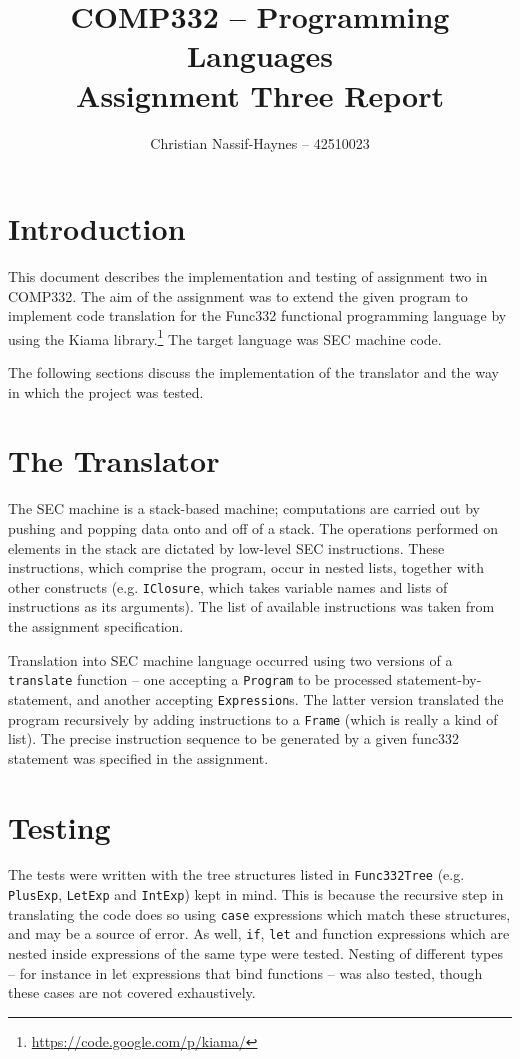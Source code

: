 \documentclass[a4paper]{article}
\begin{document}
	\begin{titlepage}
		\title{COMP332 -- Programming Languages \\[5pt]
		Assignment Three Report \vfill}
		\author{Christian Nassif-Haynes -- 42510023}
		\maketitle
	\end{titlepage}
	
	\section{Introduction}
	This document describes the implementation and testing of assignment two in COMP332. The aim of the assignment was to extend the given program to implement code translation for the Func332 functional programming language by using the Kiama library.\footnote{\url {https://code.google.com/p/kiama/}} The target language was SEC machine code.
	
	The following sections discuss the implementation of the translator and the way in which the project was tested.
	
	\section{The Translator}
	The SEC machine is a stack-based machine; computations are carried out by pushing and popping data onto and off of a stack. The operations performed on elements in the stack are dictated by low-level SEC instructions. These instructions, which comprise the program, occur in nested lists, together with other constructs (e.g. \verb=IClosure=, which takes variable names and lists of instructions as its arguments). The list of available instructions was taken from the assignment specification.
	
	Translation into SEC machine language occurred using two versions of a \verb=translate= function -- one accepting a \verb=Program= to be processed statement-by-statement, and another accepting \verb=Expression=s. The latter version translated the program recursively by adding instructions to a \verb=Frame= (which is really a kind of list). The precise instruction sequence to be generated by a given func332 statement was specified in the assignment.

	\section{Testing}
	The tests were written with the tree structures listed in \verb=Func332Tree= (e.g. \verb=PlusExp=, \verb=LetExp= and \verb=IntExp=) kept in mind. This is because the recursive step in translating the code does so using \verb=case= expressions which match these structures, and may be a source of error. As well, \verb=if=, \verb=let= and function expressions which are nested inside expressions of the same type were tested. Nesting of different types -- for instance in let expressions that bind functions -- was also tested, though these cases are not covered exhaustively.
\end{document}
